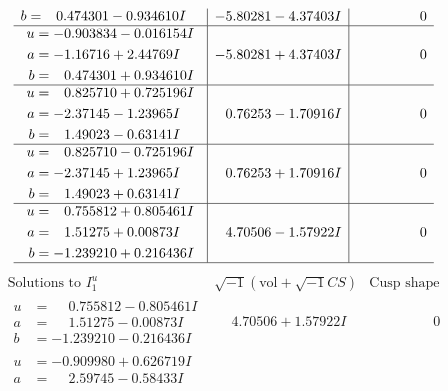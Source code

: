 \documentclass[1p]{elsarticle_modified}
\theoremstyle{definition}
\newcommand{\I}{\sqrt{-1}}
\begin{document}
$$\begin{array}{c|c|c}
\begin{aligned}
b &= \phantom{-}0.474301 - 0.934610 I\end{aligned}
 & -5.80281 - 4.37403 I & \phantom{-0.000000 } 0 \\ \hline\begin{aligned}
u &= -0.903834 - 0.016154 I \\
a &= -1.16716 + 2.44769 I \\
b &= \phantom{-}0.474301 + 0.934610 I\end{aligned}
 & -5.80281 + 4.37403 I & \phantom{-0.000000 } 0 \\ \hline\begin{aligned}
u &= \phantom{-}0.825710 + 0.725196 I \\
a &= -2.37145 - 1.23965 I \\
b &= \phantom{-}1.49023 - 0.63141 I\end{aligned}
 & \phantom{-}0.76253 - 1.70916 I & \phantom{-0.000000 } 0 \\ \hline\begin{aligned}
u &= \phantom{-}0.825710 - 0.725196 I \\
a &= -2.37145 + 1.23965 I \\
b &= \phantom{-}1.49023 + 0.63141 I\end{aligned}
 & \phantom{-}0.76253 + 1.70916 I & \phantom{-0.000000 } 0 \\ \hline\begin{aligned}
u &= \phantom{-}0.755812 + 0.805461 I \\
a &= \phantom{-}1.51275 + 0.00873 I \\
b &= -1.239210 + 0.216436 I\end{aligned}
 & \phantom{-}4.70506 - 1.57922 I & \phantom{-0.000000 } 0\\
 \hline 
 \end{array}$$\newpage$$\begin{array}{c|c|c}  
\text{Solutions to }I^u_{1}& \I (\text{vol} + \sqrt{-1}CS) & \text{Cusp shape}\\
 \hline 
\begin{aligned}
u &= \phantom{-}0.755812 - 0.805461 I \\
a &= \phantom{-}1.51275 - 0.00873 I \\
b &= -1.239210 - 0.216436 I\end{aligned}
 & \phantom{-}4.70506 + 1.57922 I & \phantom{-0.000000 } 0 \\ \hline\begin{aligned}
u &= -0.909980 + 0.626719 I \\
a &= \phantom{-}2.59745 - 0.58433 I \\

\end{aligned}
\end{array}$$
\end{document}
